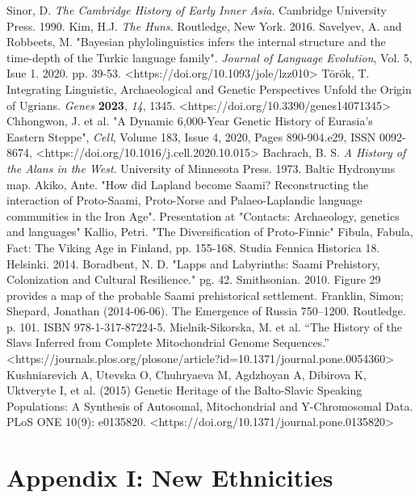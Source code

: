 \documentclass{article}
\newcommand{\specificCite}[1]{\tiny #1 \normalsize}
\begin{document}
\begin{thebibliography}{99}
		Sinor, D. \textit{The Cambridge History of Early Inner Asia}. Cambridge University Press. 1990.
		Kim, H.J. \textit{The Huns}. Routledge, New York. 2016.
		Savelyev, A. and Robbeets, M. "Bayesian phylolinguistics infers the internal structure and the time-depth of the Turkic language family". \textit{Journal of Language Evolution}, Vol. 5, Isue 1. 2020. pp. 39-53. <https://doi.org/10.1093/jole/lzz010>
		Török, T. Integrating Linguistic, Archaeological and Genetic Perspectives Unfold the Origin of Ugrians. \textit{Genes} \textbf{2023}, \textit{14}, 1345. <https://doi.org/10.3390/genes14071345>
		Chhongwon, J. et al. "A Dynamic 6,000-Year Genetic History of Eurasia’s Eastern Steppe", \textit{Cell}, Volume 183, Issue 4, 2020, Pages 890-904.e29, ISSN 0092-8674, <https://doi.org/10.1016/j.cell.2020.10.015>
		Bachrach, B. S. \textit{A History of the Alans in the West}. University of Minnesota Press. 1973.
		Baltic Hydronyms map.
		Akiko, Ante. "How did Lapland become Saami? Reconstructing the interaction of Proto-Saami, Proto-Norse and Palaeo-Laplandic language communities in the Iron Age". Presentation at "Contacts: Archaeology, genetics and languages"
		Kallio, Petri. "The Diversification of Proto-Finnic" Fibula, Fabula, Fact: The Viking Age in Finland, pp. 155-168. Studia Fennica Historica 18. Helsinki. 2014.
		Boradbent, N. D. "Lapps and Labyrinths:  Saami Prehistory, Colonization and Cultural Resilience." pg. 42. Smithsonian. 2010. \specificCite{Figure 29 provides a map of the probable Saami prehistorical settlement.}		
		Franklin, Simon; Shepard, Jonathan (2014-06-06). The Emergence of Russia 750–1200. Routledge. p. 101. ISBN 978-1-317-87224-5.
		Mielnik-Sikorska, M. et al. “The History of the Slavs Inferred from Complete Mitochondrial Genome Sequences.” <https://journals.plos.org/plosone/article?id=10.1371/journal.pone.0054360>
		Kushniarevich A, Utevska O, Chuhryaeva M, Agdzhoyan A, Dibirova K, Uktveryte I, et al. (2015) Genetic Heritage of the Balto-Slavic Speaking Populations: A Synthesis of Autosomal, Mitochondrial and Y-Chromosomal Data. PLoS ONE 10(9): e0135820. <https://doi.org/10.1371/journal.pone.0135820>
	\end{thebibliography}
	
	\newpage
	
	\section{Appendix I: New Ethnicities}
	\label{sec:appendix_new_ethnicities}
	
\end{document}
